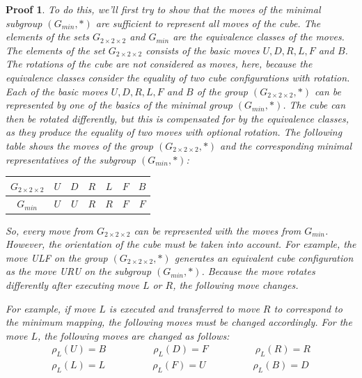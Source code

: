 \documentclass[12pt,a4paper]{article}
\theoremstyle{custom}
\newtheorem*{proofcustom}{Proof}
\newcommand{\Gtwo}{\ensuremath{G_{2\times 2\times 2}}}
\begin{document}
\begin{proofcustom}
    

To do this,  we'll first try to show that the moves of the minimal subgroup $\left(G_{min}, \scriptstyle*\right)$ are sufficient to represent all moves of the cube. The elements of the sets $\Gtwo$ and $G_{min}$ are the equivalence classes of the moves. The elements of the set $\Gtwo$ consists of the basic moves $U, D, R, L, F$ and $B$. The rotations of the cube are not considered as moves, here, because the equivalence classes consider the equality of two cube configurations with rotation.
Each of the basic moves $U, D, R, L, F$ and $B$ of the group $\left(\Gtwo, \scriptstyle*\right)$ can be represented by one of the basics of the minimal group $\left(G_{min}, \scriptstyle*\right)$. The cube can then be rotated differently, but this is compensated for by the equivalence classes, as they produce the equality of two moves with optional rotation. The following table shows the moves of the group $\left(\Gtwo, \scriptstyle*\right)$ and the corresponding minimal representatives of the subgroup $\left(G_{min}, \scriptstyle*\right)$:
\begin{center}
\begin{tabular}{c c c c c c c }
$\Gtwo$ & $U$ & $D$ & $R$  & $L$  & $F$  & $B$  \\
\midrule
$G_{min}$ & $U$ & $U$ & $R$  & $R$  & $F$  & $F$  \\
\end{tabular}
\end{center}

So, every move from $\Gtwo$ can be represented with the moves from $G_{min}$. However, the orientation of the cube must be taken into account. For example, the move \textit{ULF} on the group $(\Gtwo, \scriptstyle*)$ generates an equivalent cube configuration as the move \textit{URU} on the subgroup $(G_{min}, \scriptstyle*)$. Because the move rotates differently after executing move $L$ or $R$, the following move changes.

For example, if move $L$ is executed and transferred to move $R$ to correspond to the minimum mapping, the following moves must be changed accordingly. For the move $L$, the following moves are changed as follows:
\begin{align*}
\rho_L(U) = B \ \ \ \ \ \ \ \ \ \ \ \ \ \ \ \ \ \ \ \ \ \  \rho_L(D) = F \ \ \ \ \ \ \ \ \ \ \ \ \ \ \ \ \ \ \ \ \ \   \rho_L(R) = R \\
\rho_L(L) = L \ \ \ \ \ \ \ \ \ \ \ \ \ \ \ \ \ \ \ \ \ \  \rho_L(F) = U \ \ \ \ \ \ \ \ \ \ \ \ \ \ \ \ \ \ \ \ \ \  \rho_L(B) = D 
\end{align*}


\end{proofcustom}
\end{document}
